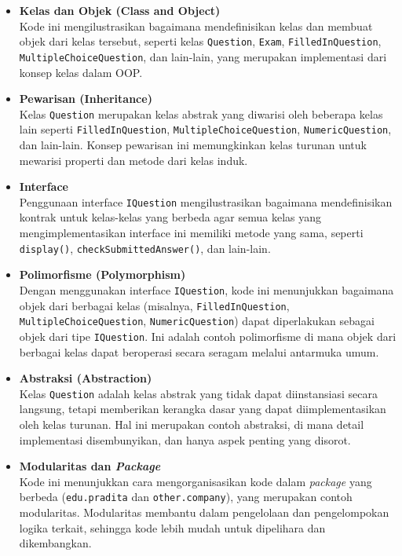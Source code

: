 \begin{itemize}
	\item \textbf{Kelas dan Objek (Class and Object)} \\
	Kode ini mengilustrasikan bagaimana mendefinisikan kelas dan membuat objek dari kelas tersebut, seperti kelas \texttt{Question}, \texttt{Exam}, \texttt{FilledInQuestion}, \texttt{MultipleChoiceQuestion}, dan lain-lain, yang merupakan implementasi dari konsep kelas dalam OOP.
	
	\item \textbf{Pewarisan (Inheritance)} \\
	Kelas \texttt{Question} merupakan kelas abstrak yang diwarisi oleh beberapa kelas lain seperti \texttt{FilledInQuestion}, \texttt{MultipleChoiceQuestion}, \texttt{NumericQuestion}, dan lain-lain. Konsep pewarisan ini memungkinkan kelas turunan untuk mewarisi properti dan metode dari kelas induk.
	
	\item \textbf{Interface} \\
	Penggunaan interface \texttt{IQuestion} mengilustrasikan bagaimana mendefinisikan kontrak untuk kelas-kelas yang berbeda agar semua kelas yang mengimplementasikan interface ini memiliki metode yang sama, seperti \texttt{display()}, \texttt{checkSubmittedAnswer()}, dan lain-lain.
	
	\item \textbf{Polimorfisme (Polymorphism)} \\
	Dengan menggunakan interface \texttt{IQuestion}, kode ini menunjukkan bagaimana objek dari berbagai kelas (misalnya, \texttt{FilledInQuestion}, \texttt{MultipleChoiceQuestion}, \texttt{NumericQuestion}) dapat diperlakukan sebagai objek dari tipe \texttt{IQuestion}. Ini adalah contoh polimorfisme di mana objek dari berbagai kelas dapat beroperasi secara seragam melalui antarmuka umum.
	
	\item \textbf{Abstraksi (Abstraction)} \\
	Kelas \texttt{Question} adalah kelas abstrak yang tidak dapat diinstansiasi secara langsung, tetapi memberikan kerangka dasar yang dapat diimplementasikan oleh kelas turunan. Hal ini merupakan contoh abstraksi, di mana detail implementasi disembunyikan, dan hanya aspek penting yang disorot.
	
	\item \textbf{Modularitas dan \textit{Package}} \\
	Kode ini menunjukkan cara mengorganisasikan kode dalam \textit{package} yang berbeda (\texttt{edu.pradita} dan \texttt{other.company}), yang merupakan contoh modularitas. Modularitas membantu dalam pengelolaan dan pengelompokan logika terkait, sehingga kode lebih mudah untuk dipelihara dan dikembangkan.
	

\end{itemize}
